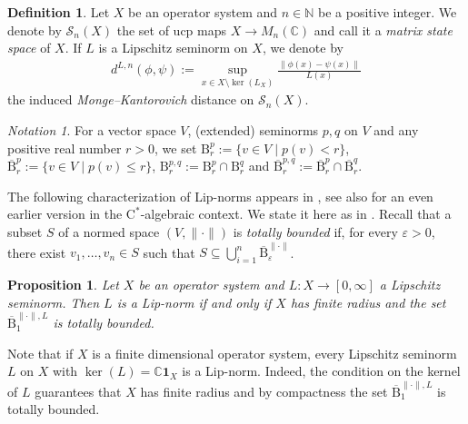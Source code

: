 \documentclass{amsart}
\theoremstyle{plain}
\newtheorem{proposition}[theorem]{Proposition}
\theoremstyle{definition}
\newtheorem{definition}[theorem]{Definition}
\theoremstyle{remark}
\newtheorem{notation}[theorem]{Notation}
\begin{document}
	\begin{definition}
		Let $X$ be an operator system and $n \in \mathbb{N}$ be a positive integer.
		We denote by $\mathcal{S}_n(X)$ the set of ucp maps $X \rightarrow M_n(\mathbb{C})$ and call it a \emph{matrix state space} of $X$.
		If $L$ is a Lipschitz seminorm on $X$, we denote by 
		\begin{align}
			d^{L,n}(\phi,\psi) := \sup_{x \in X \setminus \ker(L_X)} \frac{\lVert\phi(x) - \psi(x)\rVert}{L(x)}
		\end{align}
		the induced \emph{Monge--Kantorovich} distance on $\mathcal{S}_n(X)$.
	\end{definition}
	
	\begin{notation}
		For a vector space $V$, (extended) seminorms $p, q$ on $V$ and any positive real number $r > 0$, we set $\mathrm{B}_r^p := \{ v \in V \mid p(v) < r\}$, $\overline{\mathrm{B}}_r^p := \{ v \in V \mid p(v) \leq r\}$, $\mathrm{B}_r^{p,q} := \mathrm{B}_r^p \cap \mathrm{B}_r^q$ and $\overline{\mathrm{B}}_r^{p,q} := \overline{\mathrm{B}}_r^p \cap \overline{\mathrm{B}}_r^q$.
	\end{notation}
	
	The following characterization of Lip-norms appears in \cite[Theorem 1.8]{Rie98}, see also \cite[Theorem 6.3]{Pav98} for an even earlier version in the $\mathrm{C}^*$-algebraic context.
	We state it here as in \cite[Proposition 2.5]{Li09}.
	Recall that a subset $S$ of a normed space $(V,\lVert\cdot\rVert)$ is \emph{totally bounded} if, for every $\varepsilon > 0$, there exist $v_1,\dots,v_n \in S$ such that $S \subseteq \bigcup_{i=1}^n \overline{\mathrm{B}}_\varepsilon^{\lVert\cdot\rVert}$.
	
	\begin{proposition}\label{lem:Total-boundedness}
		Let $X$ be an operator system and $L : X \rightarrow [0,\infty]$ a Lipschitz seminorm.
		Then $L$ is a Lip-norm if and only if $X$ has finite radius and the set $\overline{\mathrm{B}}_1^{\lVert\cdot\rVert,L}$ is totally bounded.
	\end{proposition}
	
	Note that if $X$ is a finite dimensional operator system, every Lipschitz seminorm $L$ on $X$ with $\ker(L) = \mathbb{C}\mathbf{1}_X$ is a Lip-norm.
	Indeed, the condition on the kernel of $L$ guarantees that $X$ has finite radius and by compactness the set $\overline{\mathrm{B}}_1^{\lVert\cdot\rVert,L}$ is totally bounded.
	
	
	
\end{document}
